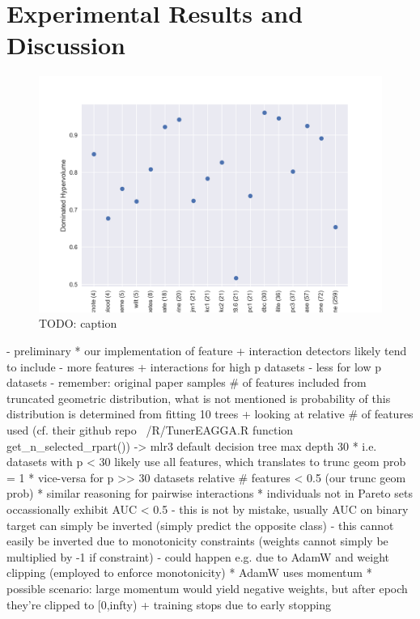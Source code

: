 \documentclass[twoside,11pt]{article}
\begin{document}
\section{Experimental Results and Discussion}
\begin{figure}
  \centering
  \includegraphics[width=0.9\linewidth]{../code/export/plot_test_dhvs.png}
  \caption{TODO: caption}
  \label{fig-test-dhvs}
\end{figure}
- preliminary
  * our implementation of feature + interaction detectors likely tend to include
    - more features + interactions for high p datasets
    - less for low p datasets
    - remember: original paper samples \# of features included from truncated geometric distribution, what is not mentioned is probability of this distribution
      is determined from fitting 10 trees + looking at relative \# of features used (cf. their github repo ~/R/TunerEAGGA.R function get\_n\_selected\_rpart())
    -> mlr3 default decision tree max depth 30
      * i.e. datasets with p < 30 likely use all features, which translates to trunc geom prob = 1
      * vice-versa for p >> 30 datasets relative \# features < 0.5 (our trunc geom prob)
      * similar reasoning for pairwise interactions
  * individuals not in Pareto sets occassionally exhibit AUC < 0.5
    - this is not by mistake, usually AUC on binary target can simply be inverted (simply predict the opposite class)
    - this cannot easily be inverted due to monotonicity constraints (weights cannot simply be multiplied by -1 if constraint)
    - could happen e.g. due to AdamW and weight clipping (employed to enforce monotonicity)
      * AdamW uses momentum
      * possible scenario: large momentum would yield negative weights, but after epoch they're clipped to [0,infty) + training stops due to early stopping
\end{document}
